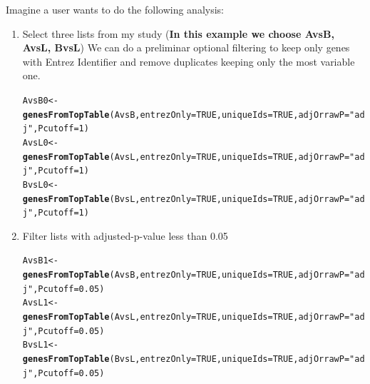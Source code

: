 \documentclass{article}\usepackage[]{graphicx}\usepackage[]{color}
\makeatletter
\newcommand{\hlnum}[1]{\textcolor[rgb]{0.686,0.059,0.569}{#1}}%
\newcommand{\hlstr}[1]{\textcolor[rgb]{0.192,0.494,0.8}{#1}}%
\newcommand{\hlstd}[1]{\textcolor[rgb]{0.345,0.345,0.345}{#1}}%
\newcommand{\hlkwb}[1]{\textcolor[rgb]{0.69,0.353,0.396}{#1}}%
\newcommand{\hlkwc}[1]{\textcolor[rgb]{0.333,0.667,0.333}{#1}}%
\newcommand{\hlkwd}[1]{\textcolor[rgb]{0.737,0.353,0.396}{\textbf{#1}}}%
\newenvironment{kframe}{%
 \def\at@end@of@kframe{}%
 \ifinner\ifhmode%
  \def\at@end@of@kframe{\end{minipage}}%
  \begin{minipage}{\columnwidth}%
 \fi\fi%
 \def\FrameCommand##1{\hskip\@totalleftmargin \hskip-\fboxsep
 \colorbox{shadecolor}{##1}\hskip-\fboxsep
     \hskip-\linewidth \hskip-\@totalleftmargin \hskip\columnwidth}%
 \MakeFramed {\advance\hsize-\width
   \@totalleftmargin\z@ \linewidth\hsize
   \@setminipage}}%
 {\par\unskip\endMakeFramed%
 \at@end@of@kframe}
\newenvironment{knitrout}{}{} %
\makeatother
\begin{document}
Imagine a user wants to do the following analysis:

\begin{enumerate}
\item Select three lists from my study (\textbf{In this example we choose AvsB, AvsL, BvsL})
We can do a preliminar optional filtering to keep only genes with Entrez Identifier and remove duplicates keeping only the most variable one.
\begin{knitrout}
\color{fgcolor}\begin{kframe}
\begin{alltt}
\hlstd{AvsB0}  \hlkwb{<-} \hlkwd{genesFromTopTable} \hlstd{(AvsB,} \hlkwc{entrezOnly} \hlstd{=} \hlnum{TRUE}\hlstd{,} \hlkwc{uniqueIds}\hlstd{=}\hlnum{TRUE}\hlstd{,} \hlkwc{adjOrrawP} \hlstd{=} \hlstr{"adj"}\hlstd{,} \hlkwc{Pcutoff} \hlstd{=} \hlnum{1}\hlstd{)}
\hlstd{AvsL0}  \hlkwb{<-} \hlkwd{genesFromTopTable} \hlstd{(AvsL,} \hlkwc{entrezOnly} \hlstd{=} \hlnum{TRUE}\hlstd{,} \hlkwc{uniqueIds}\hlstd{=}\hlnum{TRUE}\hlstd{,} \hlkwc{adjOrrawP} \hlstd{=} \hlstr{"adj"}\hlstd{,} \hlkwc{Pcutoff} \hlstd{=} \hlnum{1}\hlstd{)}
\hlstd{BvsL0}  \hlkwb{<-} \hlkwd{genesFromTopTable} \hlstd{(BvsL,} \hlkwc{entrezOnly} \hlstd{=} \hlnum{TRUE}\hlstd{,} \hlkwc{uniqueIds}\hlstd{=}\hlnum{TRUE}\hlstd{,} \hlkwc{adjOrrawP} \hlstd{=} \hlstr{"adj"}\hlstd{,} \hlkwc{Pcutoff} \hlstd{=} \hlnum{1}\hlstd{)}
\end{alltt}
\end{kframe}
\end{knitrout}

\item Filter lists with adjusted-p-value less than 0.05

\begin{knitrout}
\color{fgcolor}\begin{kframe}
\begin{alltt}
\hlstd{AvsB1}  \hlkwb{<-} \hlkwd{genesFromTopTable} \hlstd{(AvsB,} \hlkwc{entrezOnly} \hlstd{=} \hlnum{TRUE}\hlstd{,} \hlkwc{uniqueIds}\hlstd{=}\hlnum{TRUE}\hlstd{,} \hlkwc{adjOrrawP} \hlstd{=} \hlstr{"adj"}\hlstd{,} \hlkwc{Pcutoff} \hlstd{=} \hlnum{0.05}\hlstd{)}
\hlstd{AvsL1}  \hlkwb{<-} \hlkwd{genesFromTopTable} \hlstd{(AvsL,} \hlkwc{entrezOnly} \hlstd{=} \hlnum{TRUE}\hlstd{,} \hlkwc{uniqueIds}\hlstd{=}\hlnum{TRUE}\hlstd{,} \hlkwc{adjOrrawP} \hlstd{=} \hlstr{"adj"}\hlstd{,} \hlkwc{Pcutoff} \hlstd{=} \hlnum{0.05}\hlstd{)}
\hlstd{BvsL1}  \hlkwb{<-} \hlkwd{genesFromTopTable} \hlstd{(BvsL,} \hlkwc{entrezOnly} \hlstd{=} \hlnum{TRUE}\hlstd{,} \hlkwc{uniqueIds}\hlstd{=}\hlnum{TRUE}\hlstd{,} \hlkwc{adjOrrawP} \hlstd{=} \hlstr{"adj"}\hlstd{,} \hlkwc{Pcutoff} \hlstd{=} \hlnum{0.05}\hlstd{)}


\end{alltt}
\end{kframe}
\end{knitrout}
\end{enumerate}
\end{document}
